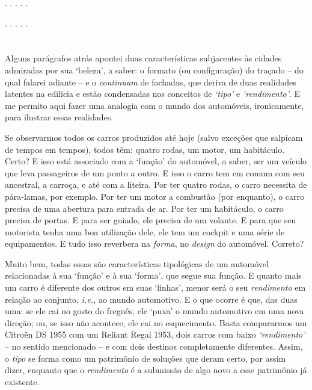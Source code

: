 \documentclass[12pt, a4paper]{book} %
\begin{document}
        \begin{center}
            . . . . .
        \end{center} 







        \begin{center}
            . . . . .
        \end{center}  

            \section{}%
            Alguns parágrafos atrás apontei duas características subjacentes às cidades admiradas por sua `beleza', a saber: o formato (ou configuração) do traçado – do qual falarei adiante – e o \textit{continuum} de fachadas, que deriva de duas realidades latentes na edilícia e estão condensadas nos conceitos de \emph{`tipo'} e \emph{`rendimento'}. E me permito aqui fazer uma analogia com o mundo dos automóveis, ironicamente, para ilustrar essas realidades.

            Se observarmos todos os carros produzidos até hoje (salvo exceções que salpicam de tempos em tempos), todos têm: quatro rodas, um motor, um habitáculo. Certo? E isso está associado com a `função' do automóvel, a saber, ser um veículo que leva passageiros de um ponto a outro. E isso o carro tem em comum com seu ancestral, a carroça, e até com a liteira. Por ter quatro rodas, o carro necessita de pára-lamas, por exemplo. Por ter um motor a combustão (por enquanto), o carro precisa de uma abertura para entrada de ar. Por ter um habitáculo, o carro precisa de portas. E para ser guiado, ele precisa de um volante. E para que seu motorista tenha uma boa utilização dele, ele tem um cockpit e uma série de equipamentos. E tudo isso reverbera na \textit{forma}, no \textit{design} do automóvel. Correto? 

            Muito bem, todas essas são características tipológicas de um automóvel relacionadas à sua `função' e à sua `forma', que segue sua função. E quanto mais um carro é diferente dos outros em suas `linhas', menor será o seu \textit{rendimento} em relação ao conjunto, \textit{i.e.,} ao mundo automotivo. E o que ocorre é que, das duas uma: se ele cai no gosto do freguês, ele `puxa' o mundo automotivo em uma nova direção; ou, se isso não acontece, ele cai no esquecimento. Basta compararmos um Citroën DS 1955 com um Reliant Regal 1953, dois carros com baixo \textit{`rendimento'} – no sentido mencionado – e com dois destinos completamente diferentes. Assim, o \textit{tipo} se forma como um patrimônio de soluções que deram certo, por assim dizer, enquanto que o \textit{rendimento} é a submissão de algo novo a esse patrimônio já existente.
	
\end{document}
